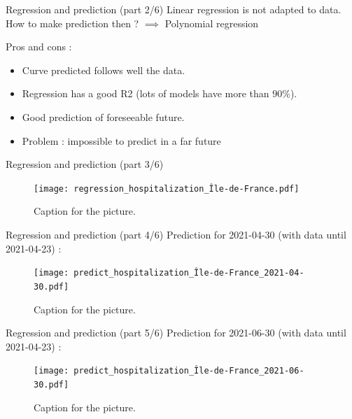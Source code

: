 \documentclass[
  ignorenonframetext,
]{beamer}
\providecommand{\tightlist}{%
  \setlength{\itemsep}{0pt}\setlength{\parskip}{0pt}}
\begin{document}
\begin{frame}{Regression and prediction (part 2/6)}
\protect\hypertarget{regression-and-prediction-part-26}{}
Linear regression is not adapted to data. \pause How to make prediction
then ? \pause \(\implies\) Polynomial regression

Pros and cons :

\begin{itemize}
\tightlist
\item
  Curve predicted follows well the data. \pause
\item
  Regression has a good R2 (lots of models have more than \(90 \%\)).
  \pause
\item
  Good prediction of foreseeable future. \pause
\item
  Problem : impossible to predict in a far future
\end{itemize}
\end{frame}

\begin{frame}{Regression and prediction (part 3/6)}
\protect\hypertarget{regression-and-prediction-part-36}{}
\begin{figure}
\centering
\texttt{[image: regression\_hospitalization\_Île-de-France.pdf]}
\caption{Caption for the picture.}
\end{figure}
\end{frame}

\begin{frame}{Regression and prediction (part 4/6)}
\protect\hypertarget{regression-and-prediction-part-46}{}
Prediction for 2021-04-30 (with data until 2021-04-23) :

\begin{figure}
\centering
\texttt{[image: predict\_hospitalization\_Île-de-France\_2021-04-30.pdf]}
\caption{Caption for the picture.}
\end{figure}
\end{frame}

\begin{frame}{Regression and prediction (part 5/6)}
\protect\hypertarget{regression-and-prediction-part-56}{}
Prediction for 2021-06-30 (with data until 2021-04-23) :

\begin{figure}
\centering
\texttt{[image: predict\_hospitalization\_Île-de-France\_2021-06-30.pdf]}
\caption{Caption for the picture.}
\end{figure}
\end{frame}
\end{document}
